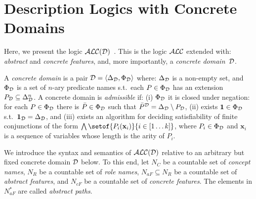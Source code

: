 \section{Description Logics with Concrete Domains}
\label{sec:alcd}

Here, we present the logic $\mathcal{ALC(D)}$~\cite{BaaderH91}.
This is the logic $\mathcal{ALC}$ extended with:
  \emph{abstract} and \emph{concrete features}, and, more importantly, a
  \emph{concrete domain}~$\mathcal{D}$.

\begin{definition}\label{def:conc:domain}
    A \emph{concrete domain} is a pair $\mathcal{D} = \langle{\Delta_{\mathcal{D}}, \Phi_{\mathcal{D}}}\rangle$ where:
        $\Delta_{\mathcal{D}}$ is a non-empty set, and
        $\Phi_{\mathcal{D}}$ is a set of $n$-ary predicate names s.t.\
        each $P \in \Phi_{\mathcal{D}}$ has an extension $P_{\mathcal{D}} \subseteq \Delta_{\mathcal{D}}^n$.
    A concrete domain is \emph{admissible} if:
        (i) $\Phi_{\mathcal{D}}$ it is closed under negation:
            for each $P\in\Phi_{\mathcal{D}}$ there is $\bar{P}\in\Phi_{\mathcal{D}}$ such that $\bar{P}^{\mathcal{D}}=\Delta_{\mathcal{D}}\setminus P_{\mathcal{D}}$,
        (ii) exists $\mathbf{1} \in \Phi_{\mathcal{D}}$ s.t.\ $\mathbf{1}_{\mathcal{D}}=\Delta_{\mathcal{D}}$, and
        (iii) exists an algorithm for deciding satisfiability of finite conjunctions of the form
            $\bigwedge\setof{P_i(\mathbf{x}_i)}{ i \in [1 \dots k]}$, where $P_i \in \Phi_{\mathcal{D}}$ and $\mathbf{x}_i$ is a sequence of variables whose length is the arity of $P_i$.
\end{definition}

We introduce the syntax and semantics of $\mathcal{ALC(D)}$ relative to an arbitrary but fixed concrete domain $\mathcal{D}$ below.
To this end, let
  $N_C$ be a countable set of \emph{concept names},
  $N_R$ be a countable set of \emph{role names},
  $N_{\mathit{aF}} \subseteq N_R$ be a countable set of \emph{abstract features}, and
  $N_{\mathit{cF}}$ be a countable set of \emph{concrete features}. 
The elements in $N_{\mathit{aF}}^{*}$ are called \emph{abstract paths}.


